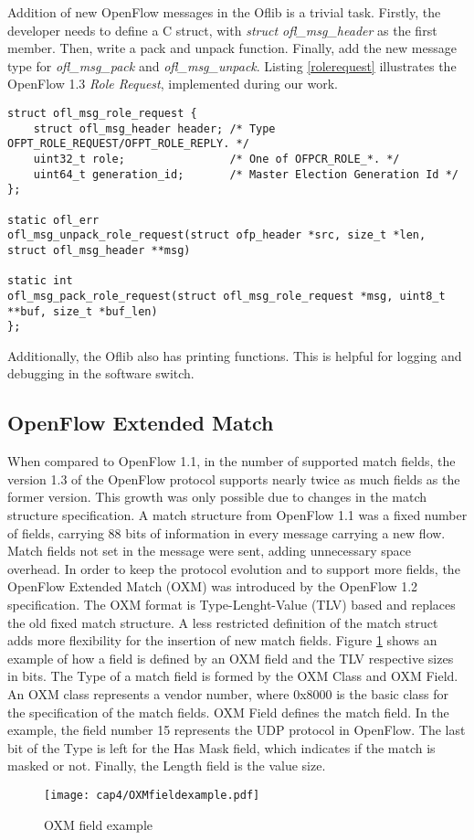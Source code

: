 Addition of new OpenFlow messages in the Oflib is a trivial task. Firstly, the developer needs to define a C struct, with \textit{struct ofl_msg_header} as the first member. Then, write a pack and unpack function. Finally, add the new message type for \textit{ofl_msg_pack} and \textit{ofl_msg_unpack}. Listing \ref{rolerequest} illustrates the OpenFlow 1.3 \textit{Role Request}, implemented during our work. 
\pagebreak
\begin{lstlisting}[caption={Oflib message Role request struct and function definition}, label=rolerequest,]
struct ofl_msg_role_request {
	struct ofl_msg_header header; /* Type OFPT_ROLE_REQUEST/OFPT_ROLE_REPLY. */
	uint32_t role;                /* One of OFPCR_ROLE_*. */
	uint64_t generation_id;       /* Master Election Generation Id */
};

static ofl_err
ofl_msg_unpack_role_request(struct ofp_header *src, size_t *len, struct ofl_msg_header **msg)

static int
ofl_msg_pack_role_request(struct ofl_msg_role_request *msg, uint8_t **buf, size_t *buf_len)
};
\end{lstlisting}

Additionally, the Oflib also has printing functions. This is helpful for logging and debugging in the software switch.      

\subsection{OpenFlow Extended Match}
\label{sec:sec42}

When compared to OpenFlow 1.1, in the number of supported match fields, the version 1.3 of the OpenFlow protocol supports nearly twice as much fields as the former version. This growth was only possible due to changes in the match structure specification. A match structure from OpenFlow 1.1 was a fixed number of fields, carrying 88 bits of information in every message carrying a new flow. Match fields not set in the message were sent, adding unnecessary space overhead.   
In order to keep the protocol evolution and to support more fields, the OpenFlow Extended Match (OXM) was introduced by the OpenFlow 1.2 specification. The OXM format is Type-Lenght-Value (TLV) based and replaces the old fixed match structure. A less restricted definition of the match struct adds more flexibility for the insertion of new match fields. Figure \ref{fig:oxmfield} shows an example of how a field is defined by an OXM field and the TLV respective sizes in bits. The Type of a match field is formed by the OXM Class and OXM Field. An OXM class represents a vendor number, where 0x8000 is the basic class for the specification of the match fields. OXM Field defines the match field. In the example, the field number 15 represents the UDP protocol in OpenFlow. The last bit of the Type is left for the Has Mask field, which indicates if the match is masked or not. Finally, the Length field is the value size.
\\
\begin{figure}[H]
\centering
\texttt{[image: cap4/OXMfieldexample.pdf]}
\caption{OXM field example}
\label{fig:oxmfield}
\end{figure}

